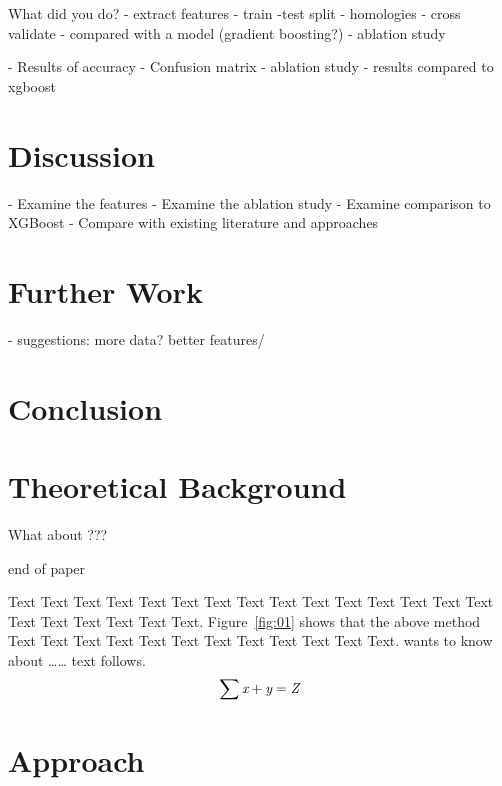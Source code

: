 \documentclass{bioinfo}
\begin{document}
What did you do?
    - extract features
    - train -test split - homologies
    - cross validate
    - compared with a model (gradient boosting?)
    - ablation study



    - Results of accuracy
    - Confusion matrix
    - ablation study
    - results compared to xgboost
\section{Discussion}
   - Examine the features
   - Examine the ablation study
   - Examine comparison to XGBoost
   - Compare with existing literature and approaches



\section{Further Work}
    - suggestions: more data? better features/

\section{Conclusion}

\section{Theoretical Background}

What about ???
















\newpage
end of paper
\newpage

Text Text Text Text Text Text  Text Text Text Text Text Text Text
Text Text  Text Text Text Text Text Text. Figure~\ref{fig:01}
shows that the above method  Text Text Text Text  Text Text Text
Text Text Text  Text Text.  \citep{Bag01} wants to know about
{\ldots}{\ldots} text follows.
\begin{equation}
\sum \text{\it x}+ \text{\it y} =\text{\it Z}\label{eq:01}\vspace*{-10pt}
\end{equation}


\section{Approach}
\end{document}
